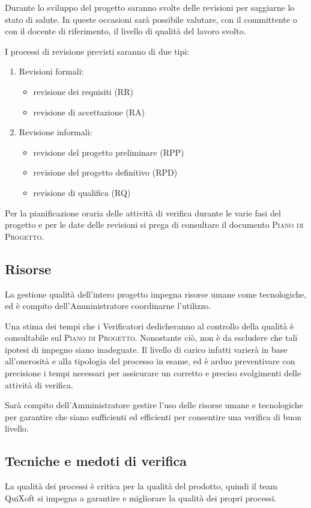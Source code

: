\documentclass[11pt,a4paper]{article}
\begin{document}
Durante lo sviluppo del progetto saranno svolte delle revisioni per saggiarne lo stato di salute. In queste occasioni sarà possibile valutare, con il committente o con il docente di riferimento, il livello di qualità del lavoro svolto.

I processi di revisione previsti saranno di due tipi:
\begin{enumerate}
 	\item Revisioni formali:
	\begin{itemize}
		\item revisione dei requisiti (RR)
		\item revisione di accettazione (RA)
	\end{itemize}
 	\item Revisione informali:
	\begin{itemize}
		\item revisione del progetto preliminare (RPP)
		\item revisione del progetto definitivo (RPD)
		\item revisione di qualifica (RQ)
	\end{itemize}
\end{enumerate}

Per la pianificazione oraria delle attività di verifica durante le varie fasi del progetto e per le date delle revisioni si prega di consultare il documento \textsc{Piano di Progetto}.
\subsection{Risorse}
La gestione qualità dell'intero progetto impegna risorse umane come tecnologiche, ed è compito dell'Amministratore coordinarne l'utilizzo.

Una stima dei tempi che i Verificatori dedicheranno al controllo della qualità è consultabile sul \textsc{Piano di Progetto}. Nonostante ciò, non è da escludere che tali ipotesi di impegno siano inadeguate. Il livello di carico infatti varierà in base all'onerosità e alla tipologia del processo in esame, ed è arduo preventivare con precisione i tempi necessari per assicurare un corretto e preciso svolgimenti delle attività di verifica.

Sarà compito dell'Amministratore gestire l'uso delle risorse umane e tecnologiche per garantire che siano sufficienti ed efficienti per consentire una verifica di buon livello.
\subsection{Tecniche e medoti di verifica}
La qualità dei processi è critica per la qualità del prodotto, quindi il team QuiXoft si impegna a garantire e migliorare la qualità dei propri processi.
\end{document}
